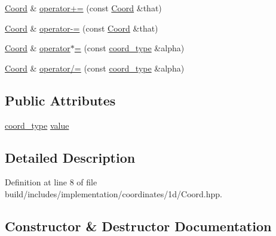 \begin{DoxyCompactItemize}
\hyperlink{classMcCAD_1_1Geometry_1_1Coord}{Coord} \& \hyperlink{classMcCAD_1_1Geometry_1_1Coord_ad3d131ab3815b8327914f30aa56020db}{operator+=} (const \hyperlink{classMcCAD_1_1Geometry_1_1Coord}{Coord} \&that)
\item 
\hyperlink{classMcCAD_1_1Geometry_1_1Coord}{Coord} \& \hyperlink{classMcCAD_1_1Geometry_1_1Coord_a313bf70626441746f74943ff8164df03}{operator-\/=} (const \hyperlink{classMcCAD_1_1Geometry_1_1Coord}{Coord} \&that)
\item 
\hyperlink{classMcCAD_1_1Geometry_1_1Coord}{Coord} \& \hyperlink{classMcCAD_1_1Geometry_1_1Coord_a0cf00b71c3bae487459e2d73eb6e44ba}{operator$\ast$=} (const \hyperlink{namespaceMcCAD_1_1Geometry_ac043b37a4a7e849fca22869e1982d2f8}{coord\+\_\+type} \&alpha)
\item 
\hyperlink{classMcCAD_1_1Geometry_1_1Coord}{Coord} \& \hyperlink{classMcCAD_1_1Geometry_1_1Coord_ad031f99a1b4ddb6142c6b6e641ba0757}{operator/=} (const \hyperlink{namespaceMcCAD_1_1Geometry_ac043b37a4a7e849fca22869e1982d2f8}{coord\+\_\+type} \&alpha)
\end{DoxyCompactItemize}
\subsection*{Public Attributes}
\begin{DoxyCompactItemize}
\item 
\hyperlink{namespaceMcCAD_1_1Geometry_ac043b37a4a7e849fca22869e1982d2f8}{coord\+\_\+type} \hyperlink{classMcCAD_1_1Geometry_1_1Coord_a540aea93d3b1a9cfd505e1e0b96b2b91}{value}
\end{DoxyCompactItemize}


\subsection{Detailed Description}


Definition at line 8 of file build/includes/implementation/coordinates/1d/\+Coord.\+hpp.



\subsection{Constructor \& Destructor Documentation}
\mbox{\label{classMcCAD_1_1Geometry_1_1Coord_a5af9c049884e5436d4bdd92a05d201bb}} 
